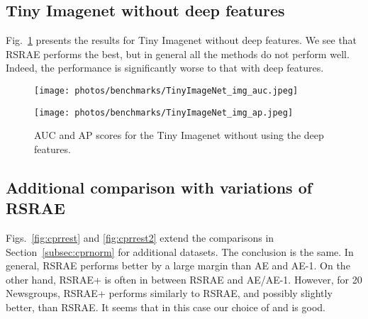 \documentclass{article} \usepackage{iclr2020_conference,times}
\def\Secref#1{Section~\ref{#1}}
\begin{document}
\subsection{Tiny Imagenet without deep features}
\label{subsec:tinyimagenetwithoutdeep}

Fig.~\ref{fig:tinyimagenet} presents the results for Tiny Imagenet without deep features. We see that RSRAE performs the best, but in general all the methods do not perform well. Indeed, the performance is significantly worse to that with deep features.

\begin{figure}[ht]
\centering
\begin{minipage}[t]{0.48\textwidth}
\centering
\texttt{[image: photos/benchmarks/TinyImageNet\_img\_auc.jpeg]}
\end{minipage}
\begin{minipage}[t]{0.48\textwidth}
\centering
\texttt{[image: photos/benchmarks/TinyImageNet\_img\_ap.jpeg]}
\end{minipage}
\caption{AUC and AP scores for the Tiny Imagenet without using the deep features.}
\label{fig:tinyimagenet}
\end{figure}


\subsection{Additional comparison with variations of RSRAE}
\label{subsec:cprnormnotshown}

Figs.~\ref{fig:cprrest} and \ref{fig:cprrest2}  extend the comparisons in \Secref{subsec:cprnorm} for additional datasets. The conclusion is the same. In general, RSRAE performs better by a large margin than AE and AE-1. On the other hand, RSRAE+ is often in between RSRAE and AE/AE-1. However, for 20 Newsgroups, RSRAE+ performs similarly to RSRAE, and possibly slightly better, than RSRAE. It seems that in this case our choice of  and  is good.
\end{document}
